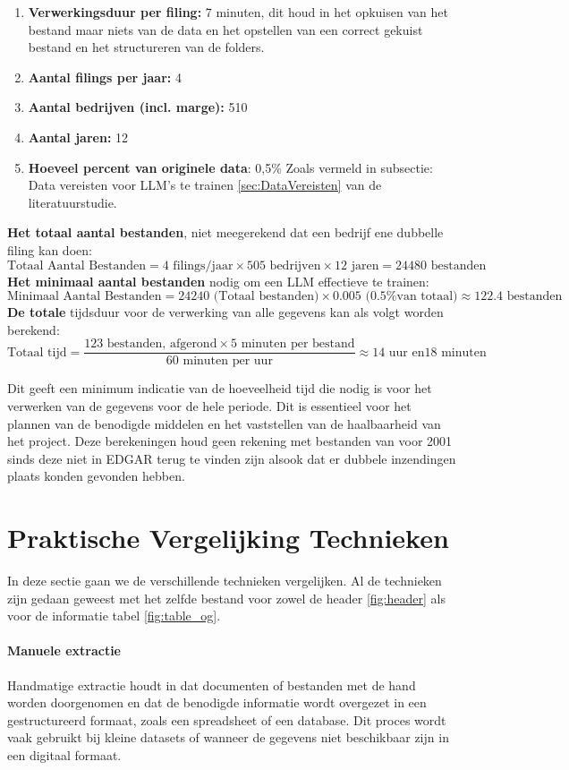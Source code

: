 \begin{enumerate}
    \item \textbf{Verwerkingsduur per filing:} 7 minuten, dit houd in het opkuisen van het bestand maar niets van de data en het opstellen van een correct gekuist bestand en het structureren van de folders.
    \item \textbf{Aantal filings per jaar:} 4
    \item \textbf{Aantal bedrijven (incl. marge):} 510
    \item \textbf{Aantal jaren:} 12
    \item \textbf{Hoeveel percent van originele data}: 0,5\% Zoals vermeld in subsectie: Data vereisten voor LLM's te trainen \ref{sec:DataVereisten} van de literatuurstudie.
\end{enumerate}

\textbf{Het totaal aantal bestanden}, niet meegerekend dat een bedrijf ene dubbelle filing kan doen:
\[
\text{Totaal Aantal Bestanden} = 4 \text{ filings/jaar} \times 505 \text{ bedrijven} \times 12 \text{ jaren} = 24480 \text{ bestanden}
\]
\textbf{Het minimaal aantal bestanden} nodig om een LLM effectieve te trainen:
\[
\text{Minimaal Aantal Bestanden} = 24240 \text{ (Totaal bestanden)} \times 0.005 \text{ (0.5\% van totaal)} \approx 122.4 \text{ bestanden}
\]
\textbf{De totale} tijdsduur voor de verwerking van alle gegevens kan als volgt worden berekend:
\[
\text{Totaal tijd} = \frac{123 \text{ bestanden, afgerond} \times 5 \text{ minuten per bestand}}{60 \text{ minuten per uur}} \approx 14 \text{ uur en}  18 \text{ minuten}
\]

Dit geeft een minimum indicatie van de hoeveelheid tijd die nodig is voor het verwerken van de gegevens voor de hele periode. Dit is essentieel voor het plannen van de benodigde middelen en het vaststellen van de haalbaarheid van het project. Deze berekeningen houd geen rekening met bestanden van voor 2001 sinds deze niet in EDGAR terug te vinden zijn alsook dat er dubbele inzendingen plaats konden gevonden hebben.



\section{Praktische Vergelijking Technieken}
In deze sectie gaan we de verschillende technieken vergelijken. Al de technieken zijn gedaan geweest met het zelfde bestand voor zowel de header \autoref{fig:header} als voor de informatie tabel \autoref{fig:table_og}.
\paragraph{Manuele extractie}
Handmatige extractie houdt in dat documenten of bestanden met de hand worden doorgenomen en dat de benodigde informatie wordt overgezet in een gestructureerd formaat, zoals een spreadsheet of een database. Dit proces wordt vaak gebruikt bij kleine datasets of wanneer de gegevens niet beschikbaar zijn in een digitaal formaat.

